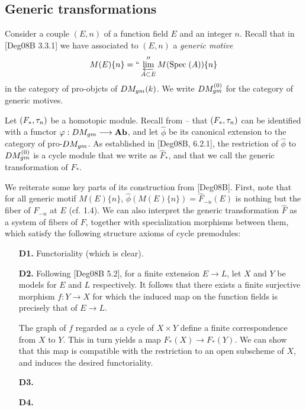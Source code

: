 \subsection{Generic transformations} Consider a couple $(E, n)$
of a function field $E$ and an integer $n$. Recall that in 
[Deg08B 3.3.1] we have associated to $(E, n)$ a \emph{generic 
motive}
\[
M(E)\{n\} = ``\varprojlim_{A \subset E}'' M(\mathrm{Spec}\;(A))\{n\}
\]
in the category of pro-objcts of $DM_{gm}(k)$. We write 
$DM_{gm}^{(0)}$ for the category of generic motives.

Let $(F_*, \tau_n)$ be a homotopic module. Recall from -- that
$(F_*, \tau_n)$ can be identified with a functor $\varphi: DM_{gm}
\longrightarrow \mathbf{Ab}$, and let $\widehat{\phi}$ be its canonical extension to
the category of pro-$DM_{gm}$. As established in [Deg08B, 6.2.1],
the restriction of $\widehat{\phi}$ to $DM_{gm}^{(0)}$ is a cycle module
that we write as $\widehat{F}_*$, and that we call the generic
transformation of $F_*$.

We reiterate some key parts of its construction from [Deg08B]. 
First, note that for all generic motif $M(E)\{n\}$, 
$\widehat{\phi}(M(E)\{n\}) = \widehat{F}_{-n}(E)$ is nothing
but the fiber of $F_{-n}$ at $E$ (cf. 1.4). We can also interpret
the generic transformation $\widehat{F}$ as a system of fibers 
of $F$, together with specialization morphisms between them,
which satisfy the following structure axioms of cycle premodules:

\begin{enumerate}
\item[\textbf{D1.}] Functoriality (which is clear).

\item[\textbf{D2.}] Following [Deg08B 5.2], for a finite extension
$E \to L$, let $X$ and $Y$ be models for $E$ and $L$ respectively.
It follows that there exists a finite surjective morphism $f: Y 
\to X$ for which the induced map on the function fields is 
precisely that of $E \to L$.

The graph of $f$ regarded as a cycle of $X \times Y$ define a 
finite correspondence from $X$ to $Y$. This in turn yields a map 
$F_*(X) \to F_*(Y)$. We can show that this map is compatible with 
the restriction to an open subscheme of $X$, and induces the 
desired functoriality.

\item[\textbf{D3.}] 

\item[\textbf{D4.}]
\end{enumerate}
